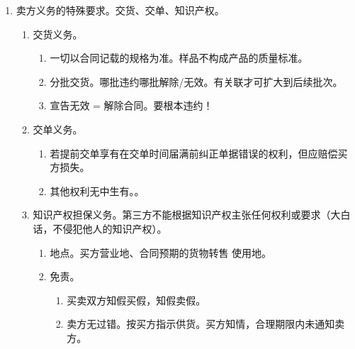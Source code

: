 \begin{enumerate}
\begin{enumerate}
                \begin{kk}{效力任意性}
                  当事人意思自治优先。合同 \dy 公约规定，但约定内容不一样，对公约的排除效力不一样。
                  \begin{enumerate}
                    \item 准据法的选择 \dy 公约适用。在我国，合同中若明确选择准据法，将完全排除公约适用。
                    \item 可以通过合同条款约定部分排除 \hz 改变公约规定。。
                  \end{enumerate}
                \end{kk}
        \end{enumerate}
  \item 卖方义务的特殊要求。交货、交单、知识产权。
        \begin{enumerate}
          \item 交货义务。
                \begin{enumerate}
                  \item 一切以合同记载的规格为准。样品不构成产品的质量标准。
                  \item 分批交货。哪批违约哪批解除/无效。有关联才可扩大到后续批次。
                  \item 宣告无效 = 解除合同。要根本违约！
                \end{enumerate}
          \item 交单义务。
                \begin{enumerate}
                  \item 若提前交单享有在交单时间届满前纠正单据错误的权利，但应赔偿买方损失。
                  \item 其他权利无中生有。。
                \end{enumerate}
          \item 知识产权担保义务。第三方不能根据知识产权主张任何权利或要求（大白话，不侵犯他人的知识产权）。
                \begin{enumerate}
                  \item 地点。买方营业地、合同预期的货物转售 \hz 使用地。
                  \item 免责。
                        \begin{enumerate}
                          \item 买卖双方知假买假，知假卖假。
                          \item 卖方无过错。\yi 按买方指示供货。\er 买方知情，合理期限内未通知卖方。

\end{enumerate}
\end{enumerate}
\end{enumerate}
\end{enumerate}
